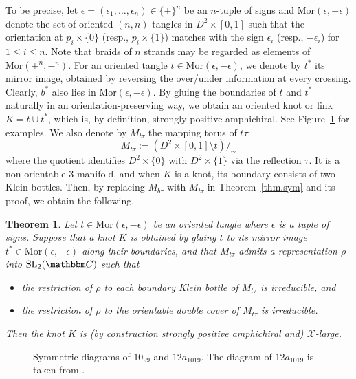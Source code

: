 \documentclass[12pt,reqno]{amsart}
\newtheorem{theorem}{Theorem}[section]
\theoremstyle{definition}
\def\BC{\mathbbm C}
\def\calX{\mathcal X}
\begin{document}
To be precise, let $\epsilon = (\epsilon_1, \ldots,\epsilon_n) \in \{\pm\}^n$ be an $n$-tuple of signs and $\mathrm{Mor} (\epsilon,-\epsilon)$ denote the set of oriented $(n,n)$-tangles in $D^2 \times [0,1]$ such that the orientation at $p_i \times \{0\}$ (resp., $p_i \times \{1\}$) matches with the sign $\epsilon_i$ (resp., $-\epsilon_i$) for $1 \leq i \leq n$. Note that braids of $n$ strands may be regarded as elements of $\mathrm{Mor}(+^n,-^n)$.
For an oriented tangle $t \in \mathrm{Mor}(\epsilon,-\epsilon)$, we denote by $t^\ast$ its mirror image, obtained by reversing the over/under information at every crossing. Clearly, $b^\ast$ also lies in $\mathrm{Mor}(\epsilon,-\epsilon)$.  By gluing the boundaries of $t$ and $t^\ast$ naturally in an orientation-preserving way, we obtain an oriented knot or link $K = t \cup t^\ast$, which is, by definition,  strongly positive amphichiral. See Figure~\ref{fig.12a1019} for examples. 
We also denote by $M_{t \tau}$ the mapping torus of $t \tau$:
$$M_{t\tau} := (D^2 \times [0,1] \setminus t) /_\sim$$
where the quotient identifies $D^2 \times \{0\}$ with $D^2 \times \{1 \}$ via the reflection $\tau$.
It is a non-orientable 3-manifold, and when $K$ is a knot, its boundary  consists of two Klein bottles. Then, by replacing $M_{b \tau}$ with $M_{t \tau}$ in Theorem~\ref{thm.sym} and its proof, we obtain the following.
\begin{theorem}\label{thm.spak}
Let $t \in \mathrm{Mor}(\epsilon,-\epsilon)$ be an oriented tangle where $\epsilon$ is a tuple of signs.
Suppose that a knot $K$ is obtained by gluing $t$ to its mirror image $t^\ast \in \mathrm{Mor}(\epsilon,-\epsilon)$
along their boundaries, and that $M_{t\tau}$ admits a representation
$\rho$ into $\mathrm{SL}_2(\BC)$ such that
\begin{itemize}
    \item[(a)] the restriction of $\rho$ to each boundary Klein bottle of $M_{t\tau}$ is irreducible, and
    \item[(b)] the restriction of $\rho$ to the orientable double cover of $M_{t\tau}$ is irreducible.
\end{itemize}
Then the knot $K$ is (by construction strongly positive amphichiral and) $\calX$-large.
\end{theorem}

\begin{figure}[!htbp]
    \centering
     \scalebox{1}{}
    \caption{Symmetric diagrams of $10_{99}$ and $12a_{1019}$. The diagram of $12a_{1019}$ is taken from \cite{lamm2022symmetric}.}
    \label{fig.12a1019}
\end{figure}
\end{document}
